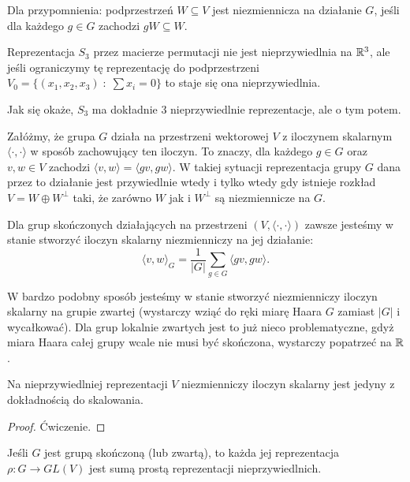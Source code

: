 Dla przypomnienia: podprzestrzeń $W\subseteq V$ jest niezmiennicza na działanie $G$, jeśli dla każdego $g\in G$ zachodzi $gW\subseteq W$.

\begin{example}
  Reprezentacja $S_3$ przez macierze permutacji nie jest nieprzywiedlnia na $\mathbb{R}^3$, ale jeśli ograniczymy tę reprezentację do podprzestrzeni $V_0=\{(x_1,x_2,x_3)\;:\;\sum x_i=0\}$ to staje się ona nieprzywiedlnia.

  Jak się okaże, $S_3$ ma dokładnie $3$ nieprzywiedlnie reprezentacje, ale o tym potem.
\end{example}

Załóżmy, że grupa $G$ działa na przestrzeni wektorowej $V$ z iloczynem skalarnym $\langle\cdot,\cdot\rangle$ w sposób zachowujący ten iloczyn. To znaczy, dla każdego $g\in G$ oraz $v,w\in V$ zachodzi $\langle v,w\rangle=\langle gv,gw\rangle$. W takiej sytuacji reprezentacja grupy $G$ dana przez to działanie jest przywiedlnie wtedy i tylko wtedy gdy istnieje rozkład $V=W\oplus W^\perp$ taki, że zarówno $W$ jak i $W^\perp$ są niezmiennicze na $G$.

Dla grup skończonych działających na przestrzeni $(V, \langle\cdot,\cdot\rangle)$ zawsze jesteśmy w stanie stworzyć iloczyn skalarny niezmienniczy na jej działanie: 
$$\langle v,w\rangle_G=\frac{1}{|G|}\sum_{g\in G}\langle gv, gw\rangle.$$

W bardzo podobny sposób jesteśmy w stanie stworzyć niezmienniczy iloczyn skalarny na grupie zwartej (wystarczy wziąć do ręki miarę Haara $G$ zamiast $|G|$ i wycałkować). Dla grup lokalnie zwartych jest to już nieco problematyczne, gdyż miara Haara całej grupy wcale nie musi być skończona, wystarczy popatrzeć na $\mathbb{R}$.

\begin{lemma}{}{}
  Na nieprzywiedlniej reprezentacji $V$ niezmienniczy iloczyn skalarny jest jedyny z dokładnością do skalowania.
\end{lemma}

\begin{proof}
  Ćwiczenie.
\end{proof}

\begin{theorem}{}{}
  Jeśli $G$ jest grupą skończoną (lub zwartą), to każda jej reprezentacja $\rho:G\to GL(V)$ jest sumą prostą reprezentacji nieprzywiedlnich.
\end{theorem}

